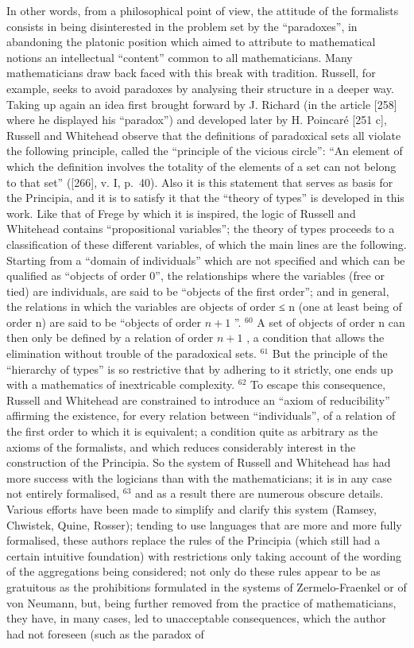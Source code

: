 In other words, from a philosophical point of view, the attitude of the formalists consists in being disinterested in the problem set by the ``paradoxes'', in abandoning the platonic position which aimed to attribute to mathematical notions an intellectual ``content'' common to all mathematicians. Many mathematicians draw back faced with this break with tradition. Russell, for example, seeks to avoid paradoxes by analysing their structure in a deeper way. Taking up again an idea first brought forward by J. Richard (in the article {[}258{]} where he displayed his ``paradox'') and developed later by H. Poincaré {[}251 c{]}, Russell and Whitehead observe that the definitions of paradoxical sets all violate the following principle, called the ``principle of the vicious circle'': ``An element of which the definition involves the totality of the elements of a set can not belong to that set'' ({[}266{]}, v. I, p.~40). Also it is this statement that serves as basis for the Principia, and it is to satisfy it that the ``theory of types'' is developed in this work. Like that of Frege by which it is inspired, the logic of Russell and Whitehead contains ``propositional variables''; the theory of types proceeds to a classification of these different variables, of which the main lines are the following. Starting from a ``domain of individuals'' which are not specified and which can be qualified as ``objects of order 0'', the relationships where the variables (free or tied) are individuals, are said to be ``objects of the first order''; and in general, the relations in which the variables are objects of order ≤ n (one at least being of order n) are said to be ``objects of order \(n + 1\) ''. \(^{60}\) A set of objects of order n can then only be defined by a relation of order \(n + 1\) , a condition that allows the elimination without trouble of the paradoxical sets. \(^{61}\) But the principle of the ``hierarchy of types'' is so restrictive that by adhering to it strictly, one ends up with a mathematics of inextricable complexity. \(^{62}\) To escape this consequence, Russell and Whitehead are constrained to introduce an ``axiom of reducibility'' affirming the existence, for every relation between ``individuals'', of a relation of the first order to which it is equivalent; a condition quite as arbitrary as the axioms of the formalists, and which reduces considerably interest in the construction of the Principia. So the system of Russell and Whitehead has had more success with the logicians than with the mathematicians; it is in any case not entirely formalised, \(^{63}\) and as a result there are numerous obscure details. Various efforts have been made to simplify and clarify this system (Ramsey, Chwistek, Quine, Rosser); tending to use languages that are more and more fully formalised, these authors replace the rules of the Principia (which still had a certain intuitive foundation) with restrictions only taking account of the wording of the aggregations being considered; not only do these rules appear to be as gratuitous as the prohibitions formulated in the systems of Zermelo-Fraenkel or of von Neumann, but, being further removed from the practice of mathematicians, they have, in many cases, led to unacceptable consequences, which the author had not foreseen (such as the paradox of 